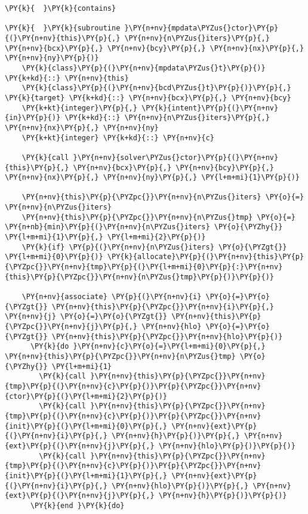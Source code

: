 \begin{Verbatim}[commandchars=\\\{\}]
\PY{k}{  }\PY{k}{contains}

\PY{k}{  }\PY{k}{subroutine }\PY{n+nv}{mpdata\PYZus{}ctor}\PY{p}{(}\PY{n+nv}{this}\PY{p}{,} \PY{n+nv}{n\PYZus{}iters}\PY{p}{,} \PY{n+nv}{bcx}\PY{p}{,} \PY{n+nv}{bcy}\PY{p}{,} \PY{n+nv}{nx}\PY{p}{,} \PY{n+nv}{ny}\PY{p}{)}
    \PY{k}{class}\PY{p}{(}\PY{n+nv}{mpdata\PYZus{}t}\PY{p}{)} \PY{k+kd}{::} \PY{n+nv}{this}
    \PY{k}{class}\PY{p}{(}\PY{n+nv}{bcd\PYZus{}t}\PY{p}{)}\PY{p}{,} \PY{k}{target} \PY{k+kd}{::} \PY{n+nv}{bcx}\PY{p}{,} \PY{n+nv}{bcy}
    \PY{k+kt}{integer}\PY{p}{,} \PY{k}{intent}\PY{p}{(}\PY{n+nv}{in}\PY{p}{)} \PY{k+kd}{::} \PY{n+nv}{n\PYZus{}iters}\PY{p}{,} \PY{n+nv}{nx}\PY{p}{,} \PY{n+nv}{ny}
    \PY{k+kt}{integer} \PY{k+kd}{::} \PY{n+nv}{c}

    \PY{k}{call }\PY{n+nv}{solver\PYZus{}ctor}\PY{p}{(}\PY{n+nv}{this}\PY{p}{,} \PY{n+nv}{bcx}\PY{p}{,} \PY{n+nv}{bcy}\PY{p}{,} \PY{n+nv}{nx}\PY{p}{,} \PY{n+nv}{ny}\PY{p}{,} \PY{l+m+mi}{1}\PY{p}{)}

    \PY{n+nv}{this}\PY{p}{\PYZpc{}}\PY{n+nv}{n\PYZus{}iters} \PY{o}{=} \PY{n+nv}{n\PYZus{}iters}
    \PY{n+nv}{this}\PY{p}{\PYZpc{}}\PY{n+nv}{n\PYZus{}tmp} \PY{o}{=} \PY{n+nb}{min}\PY{p}{(}\PY{n+nv}{n\PYZus{}iters} \PY{o}{\PYZhy{}} \PY{l+m+mi}{1}\PY{p}{,} \PY{l+m+mi}{2}\PY{p}{)}
    \PY{k}{if} \PY{p}{(}\PY{n+nv}{n\PYZus{}iters} \PY{o}{\PYZgt{}} \PY{l+m+mi}{0}\PY{p}{)} \PY{k}{allocate}\PY{p}{(}\PY{n+nv}{this}\PY{p}{\PYZpc{}}\PY{n+nv}{tmp}\PY{p}{(}\PY{l+m+mi}{0}\PY{p}{:}\PY{n+nv}{this}\PY{p}{\PYZpc{}}\PY{n+nv}{n\PYZus{}tmp}\PY{p}{)}\PY{p}{)} 

    \PY{n+nv}{associate} \PY{p}{(}\PY{n+nv}{i} \PY{o}{=}\PY{o}{\PYZgt{}} \PY{n+nv}{this}\PY{p}{\PYZpc{}}\PY{n+nv}{i}\PY{p}{,} \PY{n+nv}{j} \PY{o}{=}\PY{o}{\PYZgt{}} \PY{n+nv}{this}\PY{p}{\PYZpc{}}\PY{n+nv}{j}\PY{p}{,} \PY{n+nv}{hlo} \PY{o}{=}\PY{o}{\PYZgt{}} \PY{n+nv}{this}\PY{p}{\PYZpc{}}\PY{n+nv}{hlo}\PY{p}{)}
      \PY{k}{do }\PY{n+nv}{c}\PY{o}{=}\PY{l+m+mi}{0}\PY{p}{,} \PY{n+nv}{this}\PY{p}{\PYZpc{}}\PY{n+nv}{n\PYZus{}tmp} \PY{o}{\PYZhy{}} \PY{l+m+mi}{1}
        \PY{k}{call }\PY{n+nv}{this}\PY{p}{\PYZpc{}}\PY{n+nv}{tmp}\PY{p}{(}\PY{n+nv}{c}\PY{p}{)}\PY{p}{\PYZpc{}}\PY{n+nv}{ctor}\PY{p}{(}\PY{l+m+mi}{2}\PY{p}{)}
        \PY{k}{call }\PY{n+nv}{this}\PY{p}{\PYZpc{}}\PY{n+nv}{tmp}\PY{p}{(}\PY{n+nv}{c}\PY{p}{)}\PY{p}{\PYZpc{}}\PY{n+nv}{init}\PY{p}{(}\PY{l+m+mi}{0}\PY{p}{,} \PY{n+nv}{ext}\PY{p}{(}\PY{n+nv}{i}\PY{p}{,} \PY{n+nv}{h}\PY{p}{)}\PY{p}{,} \PY{n+nv}{ext}\PY{p}{(}\PY{n+nv}{j}\PY{p}{,} \PY{n+nv}{hlo}\PY{p}{)}\PY{p}{)}
        \PY{k}{call }\PY{n+nv}{this}\PY{p}{\PYZpc{}}\PY{n+nv}{tmp}\PY{p}{(}\PY{n+nv}{c}\PY{p}{)}\PY{p}{\PYZpc{}}\PY{n+nv}{init}\PY{p}{(}\PY{l+m+mi}{1}\PY{p}{,} \PY{n+nv}{ext}\PY{p}{(}\PY{n+nv}{i}\PY{p}{,} \PY{n+nv}{hlo}\PY{p}{)}\PY{p}{,} \PY{n+nv}{ext}\PY{p}{(}\PY{n+nv}{j}\PY{p}{,} \PY{n+nv}{h}\PY{p}{)}\PY{p}{)}
      \PY{k}{end }\PY{k}{do}


\end{Verbatim}
